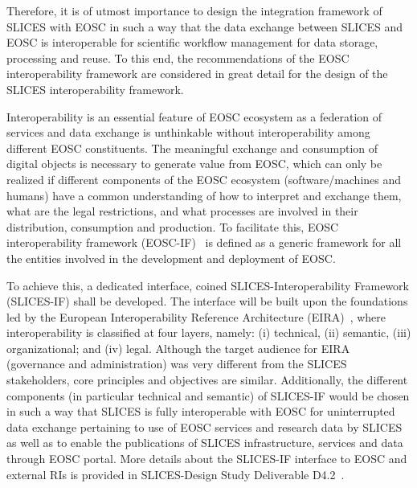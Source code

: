 Therefore, it is of utmost importance to design the integration framework of SLICES with EOSC in such a way that the data exchange between SLICES and EOSC is interoperable for scientific workflow management for data storage, processing and reuse. To this end, the recommendations of the EOSC interoperability framework  are considered in great detail for the design of the SLICES interoperability framework.

Interoperability is an essential feature of EOSC ecosystem as a federation of services and data exchange is unthinkable without interoperability among different EOSC constituents. The meaningful exchange and consumption of digital objects is necessary to generate value from EOSC, which can only be realized if different components of the EOSC ecosystem (software/machines and humans) have a common understanding of how to interpret and exchange them, what are the legal restrictions, and what processes are involved in their distribution, consumption and production. To facilitate this, EOSC interoperability framework (EOSC-IF)~\cite{eosc-if} is defined as a generic framework for all the entities involved in the development and deployment of EOSC.

To achieve this, a dedicated interface, coined SLICES-Interoperability Framework (SLICES-IF) shall be developed. The interface will be built upon the foundations led by the European Interoperability Reference Architecture (EIRA)~\cite{eira}, where interoperability is classified at four layers, namely: (i) technical, (ii) semantic, (iii) organizational; and (iv) legal. Although the target audience for EIRA (governance and administration) was very different from the SLICES stakeholders, core principles and objectives are similar. Additionally, the different components (in particular technical and semantic) of SLICES-IF would be chosen in such a way that SLICES is fully interoperable with EOSC for uninterrupted data exchange pertaining to use of EOSC services and research data by SLICES as well as to enable the publications of SLICES infrastructure, services and data through EOSC portal. More details about the SLICES-IF interface to EOSC and external RIs is provided in SLICES-Design Study Deliverable D4.2~\cite{slices-ds-d4.2}.





